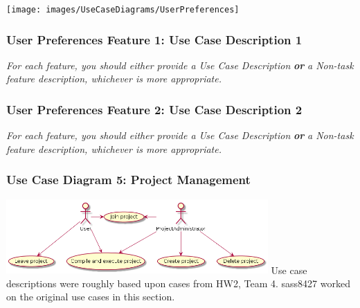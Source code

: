 \documentclass[twoside,letterpaper]{article}
\begin{document}
\texttt{[image: images/UseCaseDiagrams/UserPreferences]}

\newpage

\subsubsection[User Preferences Feature 1: Use Case Description 1]{\rmfamily\bfseries\color{black}
	User Preferences Feature 1: Use Case Description 1}
\hypertarget{RefHeading22059017292}{}
\bigskip

{\color{black}
	\foreignlanguage{english}{\textit{For each feature, you should either provide a Use Case Description
		}}\foreignlanguage{english}{\textbf{\textit{or}}}\foreignlanguage{english}{\textit{ a Non-task feature description,
		whichever is more appropriate.}}}
\newpage

\subsubsection[User Preferences Feature 2: Use Case Description 2]{\rmfamily\bfseries\color{black}
	User Preferences Feature 2: Use Case Description 2}
\hypertarget{RefHeading22059017292}{}
\bigskip

{\color{black}
	\foreignlanguage{english}{\textit{For each feature, you should either provide a Use Case Description
		}}\foreignlanguage{english}{\textbf{\textit{or}}}\foreignlanguage{english}{\textit{ a Non-task feature description,
		whichever is more appropriate.}}}
\newpage

\subsubsection[Use Case Diagram 5: Project Management (dani2918)]{\rmfamily\bfseries\color{black}
	Use Case Diagram 5: Project Management}
	
	\includegraphics[width=10cm]{images/UseCaseDiagrams/PMUCD} \newpage
Use case descriptions were roughly based upon cases from HW2, Team 4. sass8427 worked on the original use cases in this section.\newline
\end{document}
